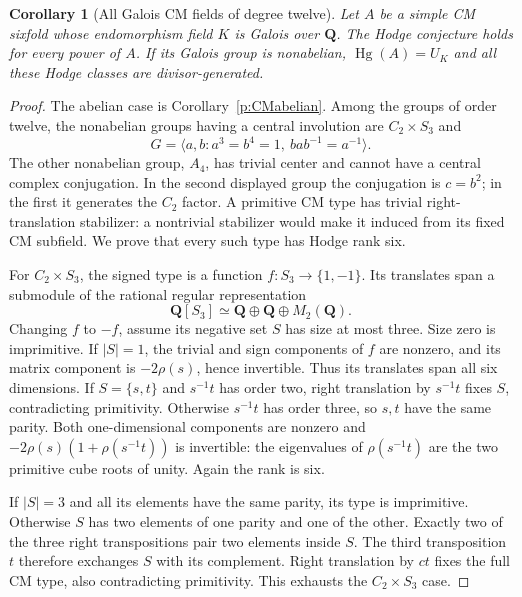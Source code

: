 \documentclass[10pt,reqno]{article}
\theoremstyle{emphasizedplain}
\newtheorem{corollary}[theorem]{Corollary}
\theoremstyle{emphasizeddefinition}
\theoremstyle{emphasizeddefinition}
\DeclareMathOperator{\Hg}{Hg}
\newcommand{\Q}{\mathbf Q}
\begin{document}
\begin{corollary}[All Galois CM fields of degree twelve]
\label{p:CMgalois}
Let $A$ be a simple CM sixfold whose endomorphism field $K$ is Galois
over $\Q$. The Hodge conjecture holds for every power of $A$.
If its Galois group is nonabelian, $\Hg(A)=U_K$ and all these
Hodge classes are divisor-generated.
\end{corollary}
\begin{proof}
The abelian case is Corollary~\ref{p:CMabelian}. Among the groups of
order twelve, the nonabelian groups having a central involution are
$C_2\times S_3$ and
\[
 G=\langle a,b:a^3=b^4=1,\ bab^{-1}=a^{-1}\rangle.
\]
The other nonabelian group, $A_4$, has trivial center and cannot have
a central complex conjugation. In the second displayed group the
conjugation is $c=b^2$; in the first it generates the $C_2$ factor.
A primitive CM type has trivial right-translation stabilizer: a
nontrivial stabilizer would make it induced from its fixed CM subfield.
We prove that every such type has Hodge rank six.

For $C_2\times S_3$, the signed type is a function
$f:S_3\to\{1,-1\}$. Its translates span a submodule of the rational
regular representation
\[
 \Q[S_3]\simeq\Q\oplus\Q\oplus M_2(\Q).
\]
Changing $f$ to $-f$, assume its negative set $S$ has size at most
three. Size zero is imprimitive. If $|S|=1$, the trivial and sign
components of $f$ are nonzero, and its matrix component is
$-2\rho(s)$, hence invertible. Thus its translates span all six
dimensions. If $S=\{s,t\}$ and $s^{-1}t$ has order two, right
translation by $s^{-1}t$ fixes $S$, contradicting primitivity.
Otherwise $s^{-1}t$ has order three, so $s,t$ have the same parity.
Both one-dimensional components are nonzero and
$-2\rho(s)(1+\rho(s^{-1}t))$ is invertible: the eigenvalues of
$\rho(s^{-1}t)$ are the two primitive cube roots of unity.
Again the rank is six.

If $|S|=3$ and all its elements have the same parity, its type is
imprimitive. Otherwise $S$ has two elements of one parity and one
of the other. Exactly two of the three right transpositions pair
two elements inside $S$. The third transposition $t$ therefore
exchanges $S$ with its complement. Right translation by $ct$ fixes
the full CM type, also contradicting primitivity. This exhausts
the $C_2\times S_3$ case.


\end{proof}
\end{document}
